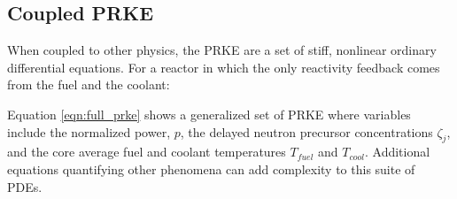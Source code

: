 \documentclass[12pt]{article}
\begin{document}
\subsection{Coupled PRKE}
When coupled to other physics, the PRKE are a set of stiff, nonlinear ordinary 
differential equations.  For a reactor in which the only reactivity feedback 
comes from the fuel and the coolant:



Equation \ref{eqn:full_prke} shows a generalized set of PRKE where
variables include the normalized power, $p$, the delayed neutron precursor
concentrations $\zeta_j$, and the core average fuel and
coolant temperatures $T_{fuel}$ and $T_{cool}$.  Additional equations
quantifying other phenomena can add complexity to this suite of PDEs.




\end{document}
